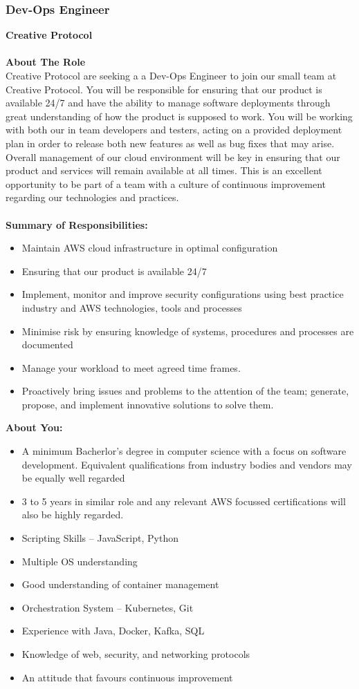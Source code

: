 \documentclass[11pt, oneside, a4paper, titlepage]{article}
\begin{document}
\subsubsection{Dev-Ops Engineer}
\textbf{Creative Protocol }
\\
\\
\textbf{About The Role}
\\
Creative Protocol are seeking a  a Dev-Ops Engineer to join our small team at Creative Protocol. You will be responsible for ensuring that our product is available 24/7 and have the ability to manage software deployments through great understanding of how the product is supposed to work. You will be working with both our in team developers and testers, acting on a provided deployment plan in order to release both new features as well as bug fixes that may arise. Overall management of our cloud environment will be key in ensuring that our product and services will remain available at all times. This is an excellent opportunity to be part of a team with a culture of continuous improvement regarding our technologies and practices. 
\\
\\
\textbf{Summary of Responsibilities:}
\begin{itemize}
	\item Maintain AWS cloud infrastructure in optimal configuration 
    	\item Ensuring that our product is available 24/7 
    	\item Implement, monitor and improve security configurations using best practice industry and AWS technologies, tools and processes 
    	\item Minimise risk by ensuring knowledge of systems, procedures and processes are documented 
    	\item Manage your workload to meet agreed time frames. 
    	\item Proactively bring issues and problems to the attention of the team; generate, propose, and implement innovative solutions to solve them.
\end{itemize}
\hfill \break
\textbf{About You:}
\begin{itemize}
    	\item A minimum Bacherlor’s degree in computer science with a focus on software development. Equivalent qualifications from industry bodies and vendors may be equally well regarded 
    	\item 3 to 5 years in similar role and any relevant AWS focussed certifications will also be highly regarded. 
    	\item Scripting Skills – JavaScript, Python 
    	\item Multiple OS understanding 
    	\item Good understanding of container management 
    	\item Orchestration System – Kubernetes, Git 
    	\item Experience with Java, Docker, Kafka, SQL 
    	\item Knowledge of web, security, and networking protocols 
    	\item An attitude that favours continuous improvement 
\end{itemize}
\end{document}
